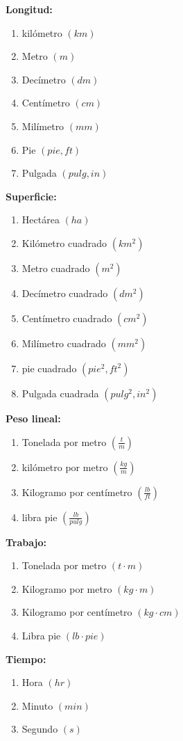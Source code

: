 \begin{multicols*}{2}
	\textbf{Longitud:}
	\begin{enumerate}
		\item kilómetro $(km)$
		\item Metro $(m)$
		\item Decímetro $(dm)$
		\item Centímetro $(cm)$
		\item Milímetro $(mm)$
		\item Pie $(pie, ft)$
		\item Pulgada $(pulg, in)$
	\end{enumerate}

	\textbf{Superficie:}
	\begin{enumerate}
		\item Hectárea $(ha)$
		\item Kilómetro cuadrado $(km^2 )$
		\item Metro cuadrado $(m^2 )$
		\item Decímetro cuadrado $(dm^2 )$
		\item Centímetro cuadrado $(cm^2 )$
		\item Milímetro cuadrado $(mm^2 )$
		\item pie cuadrado $(pie^2 ,ft^2 )$
		\item Pulgada cuadrada $(pulg^2 , in^2 )$
	\end{enumerate}

	\textbf{Peso lineal:}
	\begin{enumerate}
		\item Tonelada por metro $\left(\frac{t}{m}\right) $
		\item kilómetro por metro $\left(\frac{kg}{m}\right) $
		\item Kilogramo por centímetro $\left(\frac{lb}{ft}\right) $
		\item libra pie $\left(\frac{lb}{pulg}\right) $
	\end{enumerate}

	\textbf{Trabajo:}
	\begin{enumerate}
		\item Tonelada por metro $ \left(t\cdot m \right)$
		\item Kilogramo por metro $\left(kg \cdot m\right) $
		\item Kilogramo por centímetro $\left(kg \cdot cm\right) $
		\item Libra pie $\left(lb \cdot pie \right) $
	\end{enumerate}

	\textbf{Tiempo:}
	\begin{enumerate}
		\item Hora $\left( hr \right) $
		\item Minuto $\left( min \right)$
		\item Segundo $\left( s \right) $
	\end{enumerate}


\end{multicols*}
